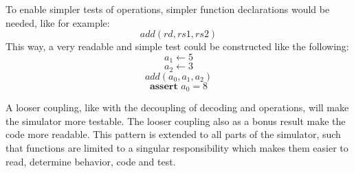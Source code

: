 To enable simpler tests of operations, simpler function declarations would be needed, like for example: $$add(rd, rs1, rs2)$$
This way, a very readable and simple test could be constructed like the following: \label{test}
$$ a_1 \leftarrow 5 $$
$$ a_2 \leftarrow 3 $$
$$ add(a_0, a_1, a_2) $$
$$ \textbf{assert } a_0 = 8 $$

A looser coupling, like with the decoupling of decoding and operations, will make the simulator more testable. 
The looser coupling also as a bonus result make the code more readable.
This pattern is extended to all parts of the simulator, such that functions are limited to a singular responsibility which makes them easier to read, determine behavior, code and test.
